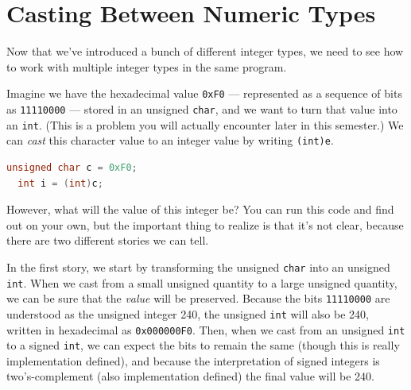 
\section{Casting Between Numeric Types}
\label{sec:types:casting}

Now that we've introduced a bunch of different integer types, we need
to see how to work with multiple integer types in the same program.

Imagine we have the hexadecimal value \lstinline'0xF0' --- represented
as a sequence of bits as \lstinline'11110000' --- stored in an
unsigned \lstinline'char', and we want to turn that value into an
\lstinline'int'.  (This is a problem you will actually encounter later
in this semester.) We can \emph{cast} this character value to an
integer value by writing \lstinline'(int)e'.
\begin{lstlisting}[language=c]
  unsigned char c = 0xF0;
  int i = (int)c;
\end{lstlisting}
However, what will the value of this integer be? You can run this code
and find out on your own, but the important thing to realize is that it's
not clear, because there are two different stories we can tell.

In the first story, we start by transforming the unsigned
\lstinline'char' into an unsigned \lstinline'int'. When we cast from a
small unsigned quantity to a large unsigned quantity, we can be sure
that the \emph{value} will be preserved. Because the bits
\lstinline'11110000' are understood as the unsigned integer 240, the
unsigned \lstinline'int' will also be 240, written in hexadecimal as
\lstinline'0x000000F0'. Then, when we cast from an unsigned
\lstinline'int' to a signed \lstinline'int', we can expect the bits to
remain the same (though this is really implementation defined), and
because the interpretation of signed integers is two's-complement
(also implementation defined) the final value will be 240.


